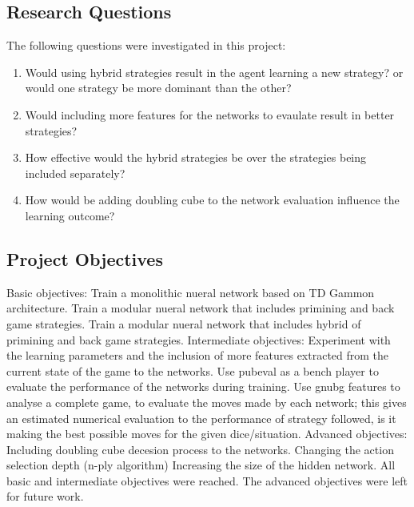 \documentclass[12pt,a4paper]{article}
\begin{document}
\subsection{Research Questions}
The following questions were investigated in this project:
\begin{enumerate}
    \item Would using hybrid strategies result in the agent learning a new strategy? or would one strategy be more dominant than the other?
    \item Would including more features for the networks to evaulate result in better strategies?
    \item How effective would the hybrid strategies be over the strategies being included separately?
    \item How would be adding doubling cube to the network evaluation influence the learning outcome?
\end{enumerate}

\subsection{Project Objectives}
Basic objectives: Train a monolithic nueral network based on TD Gammon architecture. Train a modular nueral network that includes primining and back game strategies. Train a modular nueral network that includes hybrid of primining and back game strategies. 
Intermediate objectives: Experiment with the learning parameters and the inclusion of more features extracted from the current state of the game to the networks. Use pubeval as a bench player to evaluate the performance of the networks during training. Use gnubg features to analyse a complete game, to evaluate the moves made by each network; this gives an estimated numerical evaluation to the performance of strategy followed, is it making the best possible moves for the given dice/situation. 
Advanced objectives: Including doubling cube decesion process to the networks. Changing the action selection depth (n-ply algorithm) Increasing the size of the hidden network. 
All basic and intermediate objectives were reached. The advanced objectives were left for future work. 

\end{document}

